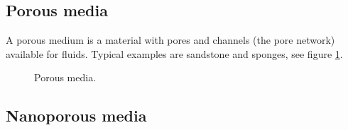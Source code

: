 \subsection{Porous media}
A porous medium is a material with pores and channels (the pore network) available for fluids. Typical examples are sandstone and sponges, see figure \ref{fig:history_porous_media}. 
\begin{figure}[h]
\begin{center}
\label{fig:history_porous_media}
\end{center}
\caption{Porous media.}
\end{figure}

\subsection{Nanoporous media}
